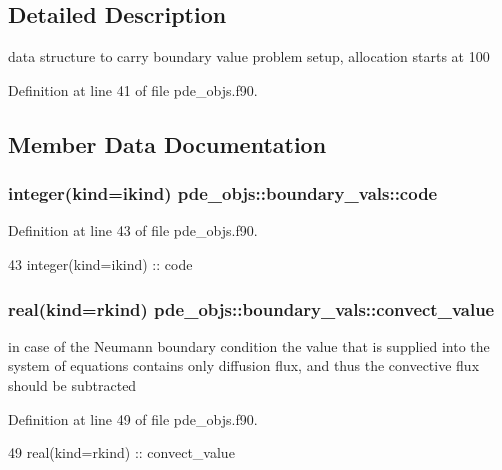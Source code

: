\subsection{Detailed Description}
data structure to carry boundary value problem setup, allocation starts at 100 

Definition at line 41 of file pde\+\_\+objs.\+f90.



\subsection{Member Data Documentation}
\subsubsection[{code}]{\setlength{\rightskip}{0pt plus 5cm}integer(kind=ikind) pde\+\_\+objs\+::boundary\+\_\+vals\+::code}\label{structpde__objs_1_1boundary__vals_ad62cb93c29cff8c927706bbe810f8f84}


Definition at line 43 of file pde\+\_\+objs.\+f90.


\begin{DoxyCode}
43     \textcolor{keywordtype}{integer(kind=ikind)} :: code
\end{DoxyCode}
\subsubsection[{convect\+\_\+value}]{\setlength{\rightskip}{0pt plus 5cm}real(kind=rkind) pde\+\_\+objs\+::boundary\+\_\+vals\+::convect\+\_\+value}\label{structpde__objs_1_1boundary__vals_a71ea5a9363d8811171caddfed9003662}


in case of the Neumann boundary condition the value that is supplied into the system of equations contains only diffusion flux, and thus the convective flux should be subtracted 



Definition at line 49 of file pde\+\_\+objs.\+f90.


\begin{DoxyCode}
49     \textcolor{keywordtype}{real(kind=rkind)}    :: convect\_value
\end{DoxyCode}

